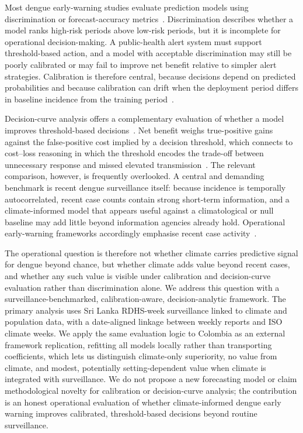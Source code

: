 \documentclass[11pt,a4paper]{article}
\begin{document}
Most dengue early-warning studies evaluate prediction models using discrimination or forecast-accuracy metrics~\cite{Johansson2019,Baharom2022,HussainAlkhateeb2021,Lowe2021}. Discrimination describes whether a model ranks high-risk periods above low-risk periods, but it is incomplete for operational decision-making. A public-health alert system must support threshold-based action, and a model with acceptable discrimination may still be poorly calibrated or may fail to improve net benefit relative to simpler alert strategies. Calibration is therefore central, because decisions depend on predicted probabilities and because calibration can drift when the deployment period differs in baseline incidence from the training period~\cite{VanCalster2019,VanCalster2023,SteyerbergVergouwe2014}.

Decision-curve analysis offers a complementary evaluation of whether a model improves threshold-based decisions~\cite{Vickers2006,Vickers2016,Vickers2019}. Net benefit weighs true-positive gains against the false-positive cost implied by a decision threshold, which connects to cost--loss reasoning in which the threshold encodes the trade-off between unnecessary response and missed elevated transmission~\cite{Murphy1985,Tozan2023}. The relevant comparison, however, is frequently overlooked. A central and demanding benchmark is recent dengue surveillance itself: because incidence is temporally autocorrelated, recent case counts contain strong short-term information, and a climate-informed model that appears useful against a climatological or null baseline may add little beyond information agencies already hold. Operational early-warning frameworks accordingly emphasise recent case activity~\cite{EWARScsd}.

The operational question is therefore not whether climate carries predictive signal for dengue beyond chance, but whether climate adds value beyond recent cases, and whether any such value is visible under calibration and decision-curve evaluation rather than discrimination alone. We address this question with a surveillance-benchmarked, calibration-aware, decision-analytic framework. The primary analysis uses Sri Lanka RDHS-week surveillance linked to climate and population data, with a date-aligned linkage between weekly reports and ISO climate weeks. We apply the same evaluation logic to Colombia as an external framework replication, refitting all models locally rather than transporting coefficients, which lets us distinguish climate-only superiority, no value from climate, and modest, potentially setting-dependent value when climate is integrated with surveillance. We do not propose a new forecasting model or claim methodological novelty for calibration or decision-curve analysis; the contribution is an honest operational evaluation of whether climate-informed dengue early warning improves calibrated, threshold-based decisions beyond routine surveillance.
\end{document}
